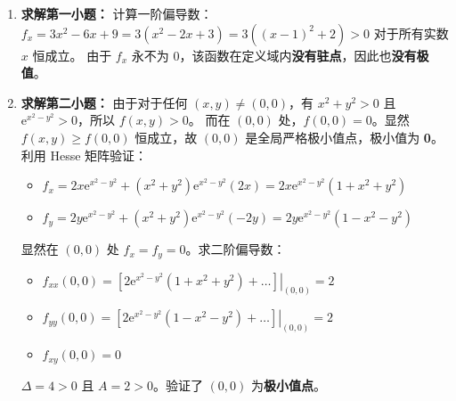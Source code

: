 \documentclass[lang=cn,11pt]{elegantbook}
\begin{document}
\begin{solution}
\begin{enumerate}
  \item[(1)] \textbf{求解第一小题：}
  计算一阶偏导数：
  $f_x = 3x^2-6x+9 = 3(x^2-2x+3) = 3((x-1)^2+2) > 0$ 对于所有实数 $x$ 恒成立。
  由于 $f_x$ 永不为 0，该函数在定义域内\textbf{没有驻点}，因此也\textbf{没有极值}。

  \item[(2)] \textbf{求解第二小题：}
  由于对于任何 $(x,y) \neq (0,0)$，有 $x^2+y^2 > 0$ 且 $\mathrm{e}^{x^2-y^2} > 0$，所以 $f(x,y) > 0$。
  而在 $(0,0)$ 处，$f(0,0) = 0$。显然 $f(x,y) \geq f(0,0)$ 恒成立，故 $(0,0)$ 是全局严格极小值点，极小值为 \textbf{0}。
  利用 Hesse 矩阵验证：
  \begin{itemize}
    \item $f_x = 2x\mathrm{e}^{x^2-y^2} + (x^2+y^2)\mathrm{e}^{x^2-y^2}(2x) = 2x\mathrm{e}^{x^2-y^2}(1+x^2+y^2)$
    \item $f_y = 2y\mathrm{e}^{x^2-y^2} + (x^2+y^2)\mathrm{e}^{x^2-y^2}(-2y) = 2y\mathrm{e}^{x^2-y^2}(1-x^2-y^2)$
  \end{itemize}
  显然在 $(0,0)$ 处 $f_x=f_y=0$。求二阶偏导数：
  \begin{itemize}
    \item $f_{xx}(0,0) = \left. \left[ 2\mathrm{e}^{x^2-y^2}(1+x^2+y^2) + \dots \right] \right|_{(0,0)} = 2$
    \item $f_{yy}(0,0) = \left. \left[ 2\mathrm{e}^{x^2-y^2}(1-x^2-y^2) + \dots \right] \right|_{(0,0)} = 2$
    \item $f_{xy}(0,0) = 0$
  \end{itemize}
  $\Delta = 4 > 0$ 且 $A=2 > 0$。验证了 $(0,0)$ 为\textbf{极小值点}。


\end{enumerate}
\end{solution}
\end{document}
